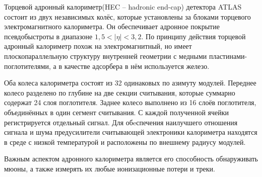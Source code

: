 Торцевой адронный калориметр(HEC -- hadronic end-cap) детектора ATLAS состоит из двух независимых колёс, которые установлены за блоками торцевого электромагнитного калориметра. Он обеспечивает адронное покрытие псевдобыстроты в диапазоне $1,5 < |\eta| < 3,2$. По принципу действия торцевой адронный калориметр похож на электромагнитный, но имеет плоскопараллельную структуру внутренней геометрии с медными пластинами-поглотителями, а в качестве адсорбера в нём используется железо.\par
Оба колеса калориметра состоят из 32 одинаковых по азимуту модулей. Переднее колесо разделено по глубине на две секции считывания, которые суммарно содержат 24 слоя поглотителя. Заднее колесо выполнено из 16 слоёв поглотителя, объединённых в один сегмент считывания. С каждой полученной ячейки регистрируется отдельный сигнал. Для обeспечения наилучшего отношения сигнала и шума предусилители считывающей электроники калориметра находятся в среде с низкой температурой и расположены по внешнему радиусу модулей.\par
Важным аспектом адронного калориметра является его способность обнаруживать мюоны, а также измерять их любые ионизационные потери и треки.\par

